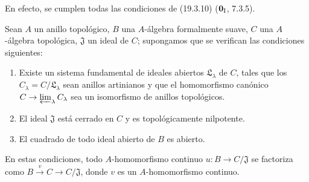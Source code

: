 En efecto, se cumplen todas las condiciones de (19.3.10)
($\mathbf 0_{\rm I}$, 7.3.5).

\begin{proposition}[19.3.12]
\label{0.19.3.12-fr}
Sean $A$ un anillo topológico, $B$ una $A$-álgebra formalmente suave,
$C$ una $A$-álgebra topológica, $\mathfrak J$ un ideal de $C$; supongamos que se verifican las
condiciones siguientes:
\begin{enumerate}
  \item[$1^\circ$] Existe un sistema fundamental de ideales abiertos
  $\mathfrak L_\lambda$ de $C$, tales que los
  $C_\lambda=C/\mathfrak L_\lambda$ sean anillos artinianos y que
  el homomorfismo canónico $C\to\varprojlim_\lambda C_\lambda$ sea un
  isomorfismo de anillos topológicos.
  \item[$2^\circ$] El ideal $\mathfrak J$ está cerrado en $C$ y es
  topológicamente nilpotente.
  \item[$3^\circ$] El cuadrado de todo ideal abierto de $B$ es abierto.
\end{enumerate}
En estas condiciones, todo $A$-homomorfismo continuo
$u:B\to C/\mathfrak J$ se factoriza como
$B\xrightarrow{v}C\to C/\mathfrak J$, donde $v$ es un $A$-homomorfismo
continuo.
\end{proposition}

